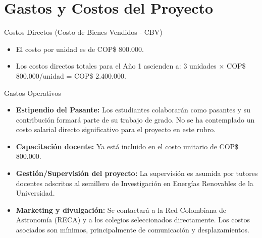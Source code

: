\section{Gastos y Costos del Proyecto}

\begin{frame}{Costos Directos (Costo de Bienes Vendidos - CBV)}
  \begin{itemize}
    \item El costo por unidad es de COP\$ 800.000.
    \item Los costos directos totales para el Año 1 ascienden a:
      3 unidades $\times$ COP\$ 800.000/unidad = COP\$ 2.400.000.
  \end{itemize}
\end{frame}

\begin{frame}{Gastos Operativos}
  \begin{itemize}
    \item \textbf{Estipendio del Pasante:} Los estudiantes colaborarán
      como pasantes y su contribución formará parte de su trabajo de grado.
      No se ha contemplado un costo salarial directo significativo para el
      proyecto en este rubro.
    \item \textbf{Capacitación docente:} Ya está incluido en el costo
      unitario de COP\$ 800.000.
    \item \textbf{Gestión/Supervisión del proyecto:} La supervisión es
      asumida por tutores docentes adscritos al semillero de Investigación
      en Energías Renovables de la Universidad.
    \item \textbf{Marketing y divulgación:} Se contactará a la Red
      Colombiana de Astronomía (RECA) y a los colegios seleccionados
      directamente. Los costos asociados son mínimos, principalmente de
      comunicación y desplazamientos.
  \end{itemize}
\end{frame}

